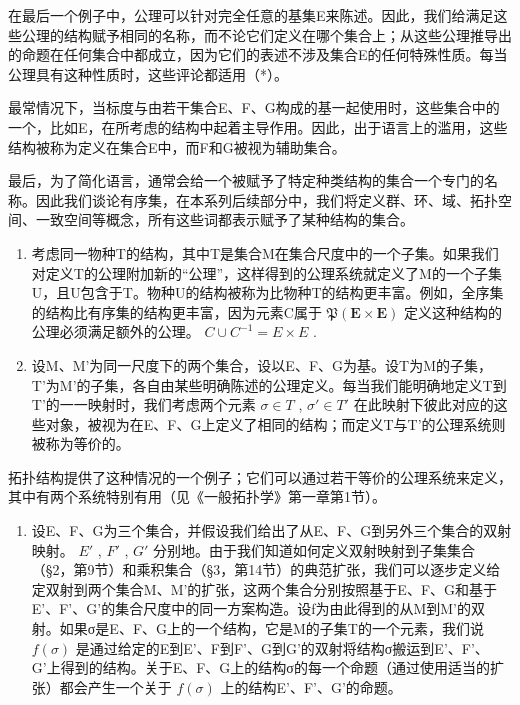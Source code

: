 在最后一个例子中，公理可以针对完全任意的基集E来陈述。因此，我们给满足这些公理的结构赋予相同的名称，而不论它们定义在哪个集合上；从这些公理推导出的命题在任何集合中都成立，因为它们的表述不涉及集合E的任何特殊性质。每当公理具有这种性质时，这些评论都适用（*）。

最常情况下，当标度与由若干集合E、F、G构成的基一起使用时，这些集合中的一个，比如E，在所考虑的结构中起着主导作用。因此，出于语言上的滥用，这些结构被称为定义在集合E中，而F和G被视为辅助集合。

最后，为了简化语言，通常会给一个被赋予了特定种类结构的集合一个专门的名称。因此我们谈论有序集，在本系列后续部分中，我们将定义群、环、域、拓扑空间、一致空间等概念，所有这些词都表示赋予了某种结构的集合。

\begin{enumerate}
\def\labelenumi{\arabic{enumi}.}
\setcounter{enumi}{2}
\item
  考虑同一物种T的结构，其中T是集合M在集合尺度中的一个子集。如果我们对定义T的公理附加新的“公理”，这样得到的公理系统就定义了M的一个子集U，且U包含于T。物种U的结构被称为比物种T的结构更丰富。例如，全序集的结构比有序集的结构更丰富，因为元素C属于 \(\mathfrak{P}(\mathbf{E} \times \mathbf{E})\) 定义这种结构的公理必须满足额外的公理。 \(C \cup C^{-1} = E \times E\) .
\item
  设M、M'为同一尺度下的两个集合，设以E、F、G为基。设T为M的子集，T'为M'的子集，各自由某些明确陈述的公理定义。每当我们能明确地定义T到T'的一一映射时，我们考虑两个元素 \(\sigma \in T\) , \(\sigma' \in T'\) 在此映射下彼此对应的这些对象，被视为在E、F、G上定义了相同的结构；而定义T与T'的公理系统则被称为等价的。
\end{enumerate}

拓扑结构提供了这种情况的一个例子；它们可以通过若干等价的公理系统来定义，其中有两个系统特别有用（见《一般拓扑学》第一章第1节）。

\begin{enumerate}
\def\labelenumi{\arabic{enumi}.}
\setcounter{enumi}{4}
\tightlist
\item
  设E、F、G为三个集合，并假设我们给出了从E、F、G到另外三个集合的双射映射。 \(E'\) , \(F'\) , \(G'\) 分别地。由于我们知道如何定义双射映射到子集集合（§2，第9节）和乘积集合（§3，第14节）的典范扩张，我们可以逐步定义给定双射到两个集合M、M'的扩张，这两个集合分别按照基于E、F、G和基于E'、F'、G'的集合尺度中的同一方案构造。设f为由此得到的从M到M'的双射。如果σ是E、F、G上的一个结构，它是M的子集T的一个元素，我们说 \(f(\sigma)\) 是通过给定的E到E'、F到F'、G到G'的双射将结构σ搬运到E'、F'、G'上得到的结构。关于E、F、G上的结构σ的每一个命题（通过使用适当的扩张）都会产生一个关于 \(f(\sigma)\) 上的结构E'、F'、G'的命题。
\end{enumerate}

